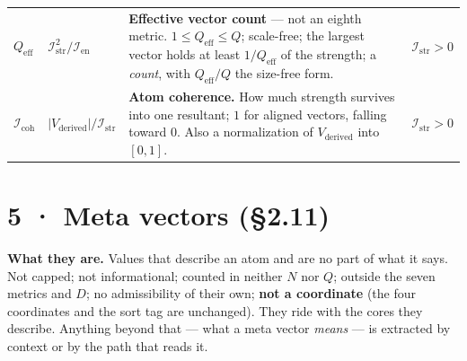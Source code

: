 \documentclass[10.5pt]{article}
\begin{document}
{\begin{longtable}{L{1.8cm}L{4.0cm}L{8.1cm}L{2.1cm}}
$Q_{\text{eff}}$ & $\mathcal{I}_{\mathrm{str}}^2/\mathcal{I}_{\mathrm{en}}$ & \textbf{Effective vector count} — not an eighth metric. $1\le Q_{\text{eff}}\le Q$; scale-free; the largest vector holds at least $1/Q_{\text{eff}}$ of the strength; a \emph{count}, with $Q_{\text{eff}}/Q$ the size-free form. & $\mathcal{I}_{\mathrm{str}}>0$ \\
$\mathcal{I}_{\mathrm{coh}}$ & $\lvert V_{\text{derived}}\rvert/\mathcal{I}_{\mathrm{str}}$ & \textbf{Atom coherence.} How much strength survives into one resultant; $1$ for aligned vectors, falling toward $0$. Also a normalization of $V_{\text{derived}}$ into $[0,1]$. & $\mathcal{I}_{\mathrm{str}}>0$ \\
\bottomrule
\end{longtable}}
\section*{5 · Meta vectors (§2.11)}
\textbf{What they are.} Values that describe an atom and are no part of what it says. Not capped; not informational; counted in neither $N$ nor $Q$; outside the seven metrics and $D$; no admissibility of their own; \textbf{not a coordinate} (the four coordinates and the sort tag are unchanged). They ride with the cores they describe. Anything beyond that — what a meta vector \emph{means} — is extracted by context or by the path that reads it.
\end{document}

